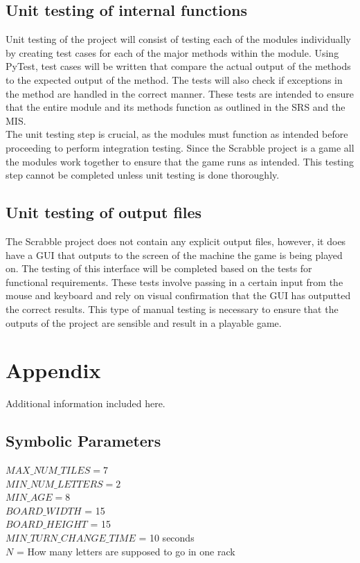 \documentclass[12pt, titlepage]{article}
\begin{document}
\subsection{Unit testing of internal functions}
Unit testing of the project will consist of testing each of the modules individually by creating test cases for each of the major methods within the module. Using PyTest, test cases will be written that  compare the actual output of the methods to the expected output of the method. The tests will also check if exceptions in the method are handled in the correct manner. These tests are intended to ensure that the entire module and its methods function as outlined in the SRS and the MIS.\\
The unit testing step is crucial, as the modules must function as intended before proceeding to perform integration testing. Since the Scrabble project is a game all the modules work together to ensure that the game runs as intended. This testing step cannot be completed unless unit testing is done thoroughly.
		
\subsection{Unit testing of output files}	
The Scrabble project does not contain any explicit output files, however, it does have a GUI that outputs to the screen of the machine the game is being played on. The testing of this interface will be completed based on the tests for functional requirements. These tests involve passing in a certain input from the mouse and keyboard and rely on visual confirmation that the GUI has outputted the correct results. This type of manual testing is necessary to ensure that the outputs of the project are sensible and result in a playable game.






\newpage

\section{Appendix}

Additional information included here.

\subsection{Symbolic Parameters}
$MAX\_NUM\_TILES= 7$\\
$MIN\_NUM\_LETTERS = 2$\\
$MIN\_AGE = 8$\\
$BOARD\_WIDTH$ = 15\\
$BOARD\_HEIGHT$ = 15\\
$MIN\_TURN\_CHANGE\_TIME$ = 10 seconds\\
$N$ = How many letters are supposed to go in one rack\\
\end{document}
